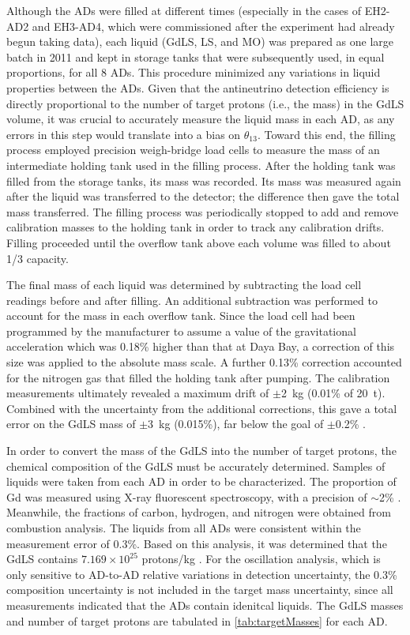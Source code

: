 \documentclass[../thesis.tex]{subfiles}
\begin{document}
Although the ADs were filled at different times (especially in the cases of EH2-AD2 and EH3-AD4, which were commissioned after the experiment had already begun taking data), each liquid (GdLS, LS, and MO) was prepared as one large batch in 2011 and kept in storage tanks that were subsequently used, in equal proportions, for all 8 ADs. This procedure minimized any variations in liquid properties between the ADs. Given that the antineutrino detection efficiency is directly proportional to the number of target protons (i.e., the mass) in the GdLS volume, it was crucial to accurately measure the liquid mass in each AD, as any errors in this step would translate into a bias on $\theta_{13}$. Toward this end, the filling process employed precision weigh-bridge load cells to measure the mass of an intermediate holding tank used in the filling process. After the holding tank was filled from the storage tanks, its mass was recorded. Its mass was measured again after the liquid was transferred to the detector; the difference then gave the total mass transferred. The filling process was periodically stopped to add and remove calibration masses to the holding tank in order to track any calibration drifts. Filling proceeded until the overflow tank above each volume was filled to about 1/3 capacity.

The final mass of each liquid was determined by subtracting the load cell readings before and after filling. An additional subtraction was performed to account for the mass in each overflow tank. Since the load cell had been programmed by the manufacturer to assume a value of the gravitational acceleration which was 0.18\% higher than that at Daya Bay, a correction of this size was applied to the absolute mass scale. A further 0.13\% correction accounted for the nitrogen gas that filled the holding tank after pumping. The calibration measurements ultimately revealed a maximum drift of $\pm$2~kg (0.01\% of 20~t). Combined with the uncertainty from the additional corrections, this gave a total error on the GdLS mass of $\pm$3~kg (0.015\%), far below the goal of $\pm$0.2\% \cite{AN2016133}.

In order to convert the mass of the GdLS into the number of target protons, the chemical composition of the GdLS must be accurately determined. Samples of liquids were taken from each AD in order to be characterized. The proportion of Gd was measured using X-ray fluorescent spectroscopy, with a precision of $\sim$2\% \cite{AN2016133}. Meanwhile, the fractions of carbon, hydrogen, and nitrogen were obtained from combustion analysis. The liquids from all ADs were consistent within the measurement error of 0.3\%. Based on this analysis, it was determined that the GdLS contains $7.169 \times 10^{25}$ protons/kg \cite{Band_2013}. For the oscillation analysis, which is only sensitive to AD-to-AD relative variations in detection uncertainty, the 0.3\% composition uncertainty is not included in the target mass uncertainty, since all measurements indicated that the ADs contain idenitcal liquids. The GdLS masses and number of target protons are tabulated in \autoref{tab:targetMasses} for each AD.
\end{document}
